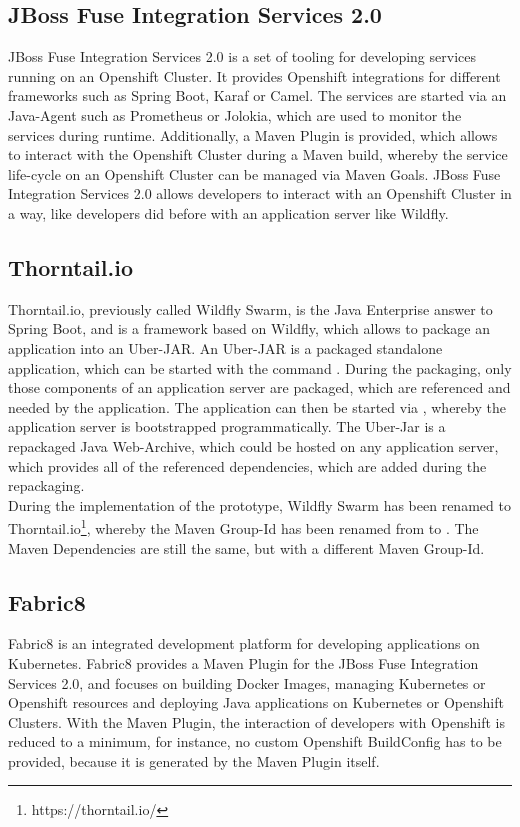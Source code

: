 \subsection{JBoss Fuse Integration Services 2.0}
\label{sec:esbi-technology-fis}
JBoss Fuse Integration Services 2.0 is a set of tooling for developing services running on an Openshift Cluster. It provides Openshift integrations for different frameworks such as Spring Boot, Karaf or Camel. The services are started via an Java-Agent such as Prometheus or Jolokia, which are used to monitor the services during runtime. Additionally, a Maven Plugin is provided, which allows to interact with the Openshift Cluster during a Maven build, whereby the service life-cycle on an Openshift Cluster can be managed via Maven Goals. JBoss Fuse Integration Services 2.0 allows developers to interact with an Openshift Cluster in a way, like developers did before with an application server like Wildfly\cite{Prometheus2018, Jolokia2018}.

\subsection{Thorntail.io}
\label{sec:esbi-technology-swarm}
Thorntail.io, previously called Wildfly Swarm, is the Java Enterprise answer to Spring Boot, and is a framework based on Wildfly, which allows to package an application into an Uber-JAR. An Uber-JAR is a packaged standalone application, which can be started with the command . During the packaging, only those components of an application server are packaged, which are referenced and needed by the application. The application can then be started via , whereby the application server is bootstrapped programmatically. The Uber-Jar is a repackaged Java Web-Archive, which could be hosted on any application server, which provides all of the referenced dependencies, which are added during the repackaging\cite{WildflySwarm2018,Wildfly2017}.  \\

During the implementation of the prototype, Wildfly Swarm has been renamed to Thorntail.io\footnote{https://thorntail.io/}, whereby the Maven Group-Id has been renamed from  to . The Maven Dependencies are still the same, but with a different Maven Group-Id.

\subsection{Fabric8}
\label{sec:esbi-technology-f8}
Fabric8 is an integrated development platform for developing applications on Kubernetes. Fabric8 provides a  Maven Plugin for the JBoss Fuse Integration Services 2.0, and focuses on building Docker Images, managing Kubernetes or Openshift resources and deploying Java applications on Kubernetes or Openshift Clusters. With the Maven Plugin, the interaction of developers with Openshift is reduced to a minimum, for instance, no custom Openshift BuildConfig has to be provided, because it is generated by the Maven Plugin itself\cite{Fabric82018}. \\

